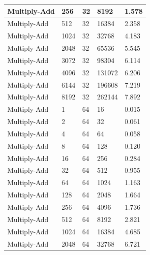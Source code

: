\documentclass{article}
\begin{document}
\begin{longtable}{|l|l|l|l|l|}
Multiply-Add       & 256  & 32          & 8192              & 1.578             \\ \hline
Multiply-Add       & 512  & 32          & 16384             & 2.358             \\ \hline
Multiply-Add       & 1024 & 32          & 32768             & 4.183             \\ \hline
Multiply-Add       & 2048 & 32          & 65536             & 5.545             \\ \hline
Multiply-Add       & 3072 & 32          & 98304             & 6.114             \\ \hline
Multiply-Add       & 4096 & 32          & 131072            & 6.206             \\ \hline
Multiply-Add       & 6144 & 32          & 196608            & 7.219             \\ \hline
Multiply-Add       & 8192 & 32          & 262144            & 7.892             \\ \hline
Multiply-Add       & 1    & 64          & 16                & 0.015             \\ \hline
Multiply-Add       & 2    & 64          & 32                & 0.061             \\ \hline
Multiply-Add       & 4    & 64          & 64                & 0.058             \\ \hline
Multiply-Add       & 8    & 64          & 128               & 0.120             \\ \hline
Multiply-Add       & 16   & 64          & 256               & 0.284             \\ \hline
Multiply-Add       & 32   & 64          & 512               & 0.955             \\ \hline
Multiply-Add       & 64   & 64          & 1024              & 1.163             \\ \hline
Multiply-Add       & 128  & 64          & 2048              & 1.664             \\ \hline
Multiply-Add       & 256  & 64          & 4096              & 1.736             \\ \hline
Multiply-Add       & 512  & 64          & 8192              & 2.821             \\ \hline
Multiply-Add       & 1024 & 64          & 16384             & 4.685             \\ \hline
Multiply-Add       & 2048 & 64          & 32768             & 6.721             \\ \hline

\end{longtable}
\end{document}
